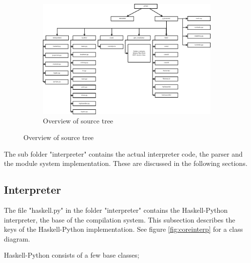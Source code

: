 \begin{figure}
\begin{figure}[H]
\centering
\includegraphics[width=\textheight]{../diags/overview.pdf}

\caption{Overview of source tree}
\label{fig:overview}

\end{figure}
\end{figure}

The sub folder "interpreter" contains the actual
interpreter code, the parser and the module system implementation. These are
discussed in the following sections.

\subsection*{Interpreter}

The file "haskell.py" in the folder "interpreter" contains the
Haskell-Python interpreter, the base of the compilation system.
This subsection describes the keys of the Haskell-Python implementation.
See figure \ref{fig:coreinterp} for a class diagram.

Haskell-Python consists of a few base classes; 

